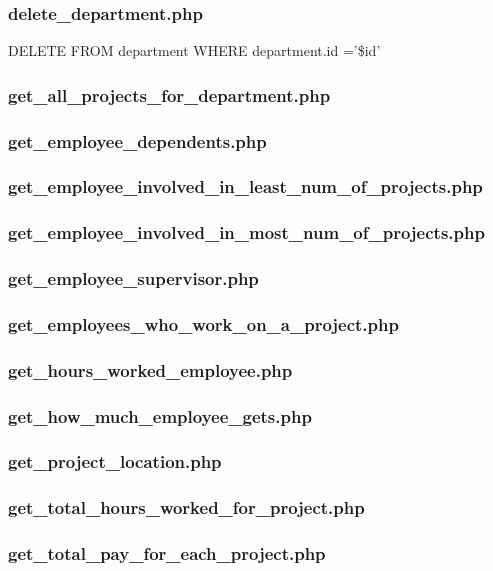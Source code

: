 \documentclass[11pt,letterpaper]{article}
\begin{document}
	\subsubsection{delete\_department.php}
	DELETE FROM department WHERE department.id ='\$id'
	\subsubsection{get\_all\_projects\_for\_department.php}
	\subsubsection{get\_employee\_dependents.php}
	\subsubsection{get\_employee\_involved\_in\_least\_num\_of\_projects.php}
	\subsubsection{get\_employee\_involved\_in\_most\_num\_of\_projects.php}
	\subsubsection{get\_employee\_supervisor.php}
	\subsubsection{get\_employees\_who\_work\_on\_a\_project.php}
	\subsubsection{get\_hours\_worked\_employee.php}
	\subsubsection{get\_how\_much\_employee\_gets.php}
	\subsubsection{get\_project\_location.php}
	\subsubsection{get\_total\_hours\_worked\_for\_project.php}
	\subsubsection{get\_total\_pay\_for\_each\_project.php}
\end{document}
